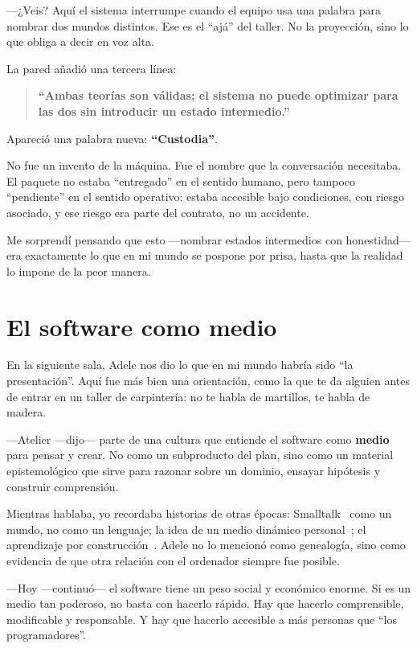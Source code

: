 \documentclass[11pt,a4paper]{article}
\begin{document}
---¿Veis? Aquí el sistema interrumpe cuando el equipo usa una palabra para
nombrar dos mundos distintos. Ese es el ``ajá'' del taller. No la proyección,
sino lo que obliga a decir en voz alta.

La pared añadió una tercera línea:

\begin{quote}
\centering
\textbf{``Ambas teorías son válidas; el sistema no puede optimizar para las
dos sin introducir un estado intermedio.''}
\end{quote}

Apareció una palabra nueva: \textbf{``Custodia''}.

No fue un invento de la máquina. Fue el nombre que la conversación
necesitaba. El paquete no estaba ``entregado'' en el sentido humano, pero
tampoco ``pendiente'' en el sentido operativo: estaba accesible bajo
condiciones, con riesgo asociado, y ese riesgo era parte del contrato, no un
accidente.

Me sorprendí pensando que esto ---nombrar estados intermedios con
honestidad--- era exactamente lo que en mi mundo se pospone por prisa, hasta
que la realidad lo impone de la peor manera.

\section{El software como medio}

En la siguiente sala, Adele nos dio lo que en mi mundo habría sido ``la
presentación''. Aquí fue más bien una orientación, como la que te da alguien
antes de entrar en un taller de carpintería: no te habla de martillos, te
habla de madera.

---Atelier ---dijo--- parte de una cultura que entiende el software como
\textbf{medio} para pensar y crear. No como un subproducto del plan, sino como
un material epistemológico que sirve para razonar sobre un dominio, ensayar
hipótesis y construir comprensión.

Mientras hablaba, yo recordaba historias de otras épocas:
Smalltalk~\cite{ingalls} como un mundo, no como un lenguaje; la idea de un
medio dinámico personal~\cite{kay}; el aprendizaje por
construcción~\cite{constructionism}. Adele no lo mencionó como genealogía,
sino como evidencia de que otra relación con el ordenador siempre fue posible.

---Hoy ---continuó--- el software tiene un peso social y económico enorme. Si
es un medio tan poderoso, no basta con hacerlo rápido. Hay que hacerlo
comprensible, modificable y responsable. Y hay que hacerlo accesible a más
personas que ``los programadores''.
\end{document}
